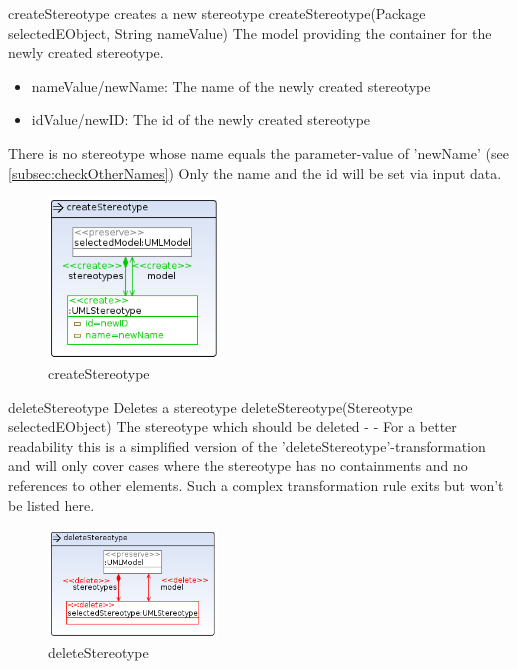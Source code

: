 \op
{createStereotype}
{creates a new stereotype}
{createStereotype(Package selectedEObject, String nameValue)}
{The model providing the container for the newly created stereotype.}
{
\begin{itemize}
 \item nameValue/newName: The name of the newly created stereotype
 \item idValue/newID: The id of the newly created stereotype
\end{itemize}
}
{There is no stereotype whose name equals the parameter-value of 'newName' (see
\ref{subsec:checkOtherNames})}
{Only the name and the id will be set via input data.}
\begin{figure}[H]
  \centering
  \includegraphics[width=0.4\textwidth]{pics/createStereotype.png}
  \caption{createStereotype}
  \label{createStereotype}
\end{figure}
\op
{deleteStereotype}
{Deletes a stereotype}
{deleteStereotype(Stereotype selectedEObject)}
{The stereotype which should be deleted}
{-}
{-}
{For a better readability this is a simplified version of the
'deleteStereotype'-transformation and will only cover cases where the stereotype
has no containments and no references to other elements. Such a complex
transformation rule exits but won't be listed here.}
\begin{figure}[H]
  \centering
  \includegraphics[width=0.4\textwidth]{pics/deleteStereotype_emptyAndUnreferenced.png}
  \caption{deleteStereotype}
  \label{deleteStereotype}
\end{figure}
